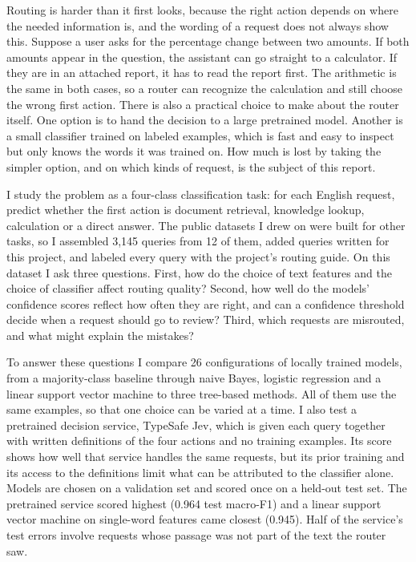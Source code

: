 \documentclass[conference]{IEEEtran}
\begin{document}
Routing is harder than it first looks, because the right action depends on where the needed information is, and the wording of a request does not always show this. Suppose a user asks for the percentage change between two amounts. If both amounts appear in the question, the assistant can go straight to a calculator. If they are in an attached report, it has to read the report first. The arithmetic is the same in both cases, so a router can recognize the calculation and still choose the wrong first action. There is also a practical choice to make about the router itself. One option is to hand the decision to a large pretrained model. Another is a small classifier trained on labeled examples, which is fast and easy to inspect but only knows the words it was trained on. How much is lost by taking the simpler option, and on which kinds of request, is the subject of this report.

I study the problem as a four-class classification task: for each English request, predict whether the first action is document retrieval, knowledge lookup, calculation or a direct answer. The public datasets I drew on were built for other tasks, so I assembled 3,145 queries from 12 of them, added queries written for this project, and labeled every query with the project's routing guide. On this dataset I ask three questions. First, how do the choice of text features and the choice of classifier affect routing quality? Second, how well do the models' confidence scores reflect how often they are right, and can a confidence threshold decide when a request should go to review? Third, which requests are misrouted, and what might explain the mistakes?

To answer these questions I compare 26 configurations of locally trained models, from a majority-class baseline through naive Bayes, logistic regression and a linear support vector machine to three tree-based methods. All of them use the same examples, so that one choice can be varied at a time. I also test a pretrained decision service, TypeSafe Jev, which is given each query together with written definitions of the four actions and no training examples. Its score shows how well that service handles the same requests, but its prior training and its access to the definitions limit what can be attributed to the classifier alone. Models are chosen on a validation set and scored once on a held-out test set. The pretrained service scored highest (0.964 test macro-F1) and a linear support vector machine on single-word features came closest (0.945). Half of the service's test errors involve requests whose passage was not part of the text the router saw.
\end{document}
